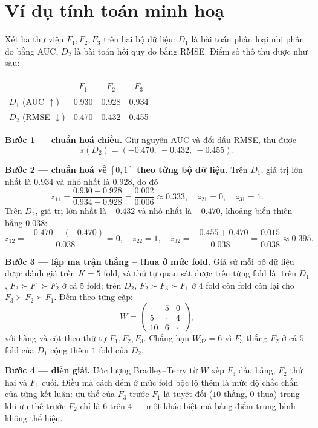 \section{Ví dụ tính toán minh hoạ}
\label{sec:vidu-pp}
\begin{vidu}
\label{vd:rank}
Xét ba thư viện $F_1, F_2, F_3$ trên hai bộ dữ liệu: $D_1$ là bài toán phân loại
nhị phân đo bằng AUC, $D_2$ là bài toán hồi quy đo bằng RMSE. Điểm số thô thu
được như sau:
\begin{center}
\begin{tabular}{@{}lccc@{}}
\toprule
 & $F_1$ & $F_2$ & $F_3$ \\
\midrule
$D_1$ (AUC $\uparrow$)  & 0.930 & 0.928 & 0.934 \\
$D_2$ (RMSE $\downarrow$) & 0.470 & 0.432 & 0.455 \\
\bottomrule
\end{tabular}
\end{center}

\textbf{Bước 1 --- chuẩn hoá chiều.} Giữ nguyên AUC và đổi dấu RMSE, thu được
\[
    \tilde{s}(D_2) = (-0.470,\ -0.432,\ -0.455).
\]

\textbf{Bước 2 --- chuẩn hoá về $[0,1]$ theo từng bộ dữ liệu.} Trên $D_1$, giá trị
lớn nhất là $0.934$ và nhỏ nhất là $0.928$, do đó
\[
    z_{11} = \frac{0.930 - 0.928}{0.934 - 0.928} = \frac{0.002}{0.006} \approx 0.333,
    \quad z_{21} = 0, \quad z_{31} = 1.
\]
Trên $D_2$, giá trị lớn nhất là $-0.432$ và nhỏ nhất là $-0.470$, khoảng biến
thiên bằng $0.038$:
\[
    z_{12} = \frac{-0.470 - (-0.470)}{0.038} = 0,\quad
    z_{22} = 1,\quad
    z_{32} = \frac{-0.455 + 0.470}{0.038} = \frac{0.015}{0.038} \approx 0.395.
\]

\textbf{Bước 3 --- lập ma trận thắng -- thua ở mức fold.} Giả sử mỗi bộ dữ liệu
được đánh giá trên $K = 5$ fold, và thứ tự quan sát được trên từng fold là:
trên $D_1$, $F_3 \succ F_1 \succ F_2$ ở cả $5$ fold; trên $D_2$,
$F_2 \succ F_3 \succ F_1$ ở $4$ fold còn fold còn lại cho
$F_3 \succ F_2 \succ F_1$. Đếm theo từng cặp:
\[
    W = \begin{pmatrix}
        \cdot & 5 & 0 \\
        5 & \cdot & 4 \\
        10 & 6 & \cdot
    \end{pmatrix},
\]
với hàng và cột theo thứ tự $F_1, F_2, F_3$. Chẳng hạn $W_{32} = 6$ vì $F_3$
thắng $F_2$ ở cả $5$ fold của $D_1$ cộng thêm $1$ fold của $D_2$.

\textbf{Bước 4 --- diễn giải.} Ước lượng Bradley--Terry từ $W$ xếp $F_3$ đầu bảng,
$F_2$ thứ hai và $F_1$ cuối. Điều mà cách đếm ở mức fold bộc lộ thêm là mức độ
chắc chắn của từng kết luận: ưu thế của $F_3$ trước $F_1$ là tuyệt đối ($10$ thắng,
$0$ thua) trong khi ưu thế trước $F_2$ chỉ là $6$ trên $4$ --- một khác biệt mà
bảng điểm trung bình không thể hiện.


\end{vidu}
